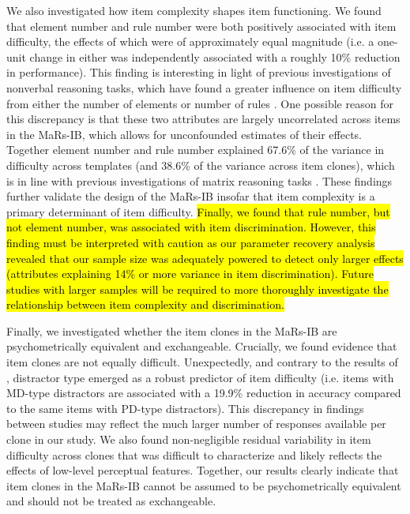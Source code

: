 \documentclass[a4paper,man,natbib]{apa6}
\begin{document}
We also investigated how item complexity shapes item functioning. We found that element number and rule number were both positively associated with item difficulty, the effects of which were of approximately equal magnitude (i.e. a one-unit change in either was independently associated with a roughly 10\% reduction in performance). This finding is interesting in light of previous investigations of nonverbal reasoning tasks, which have found a greater influence on item difficulty from either the number of elements \citep{bethell1984adaptive} or number of rules \citep{mulholland1980components}. One possible reason for this discrepancy is that these two attributes are largely uncorrelated across items in the MaRs-IB, which allows for unconfounded estimates of their effects. Together element number and rule number explained 67.6\% of the variance in difficulty across templates (and 38.6\% of the variance across item clones), which is in line with previous investigations of matrix reasoning tasks \citep{carpenter1990one, matzen1994error}. These findings further validate the design of the MaRs-IB insofar that item complexity is a primary determinant of item difficulty. \hl{Finally, we found that rule number, but not element number, was associated with item discrimination. However, this finding must be interpreted with caution as our parameter recovery analysis revealed that our sample size was adequately powered to detect only larger effects (attributes explaining 14\% or more variance in item discrimination). Future studies with larger samples will be required to more thoroughly investigate the relationship between item complexity and discrimination.}

Finally, we investigated whether the item clones in the MaRs-IB are psychometrically equivalent and exchangeable. Crucially, we found evidence that item clones are not equally difficult. Unexpectedly, and contrary to the results of \cite{chierchia2019matrix}, distractor type emerged as a robust predictor of item difficulty (i.e. items with MD-type distractors are associated with a 19.9\% reduction in accuracy compared to the same items with PD-type distractors). This discrepancy in findings between studies may reflect the much larger number of responses available per clone in our study. We also found non-negligible residual variability in item difficulty across clones that was difficult to characterize and likely reflects the effects of low-level perceptual features. Together, our results clearly indicate that item clones in the MaRs-IB cannot be assumed to be psychometrically equivalent and should not be treated as exchangeable.
\end{document}
